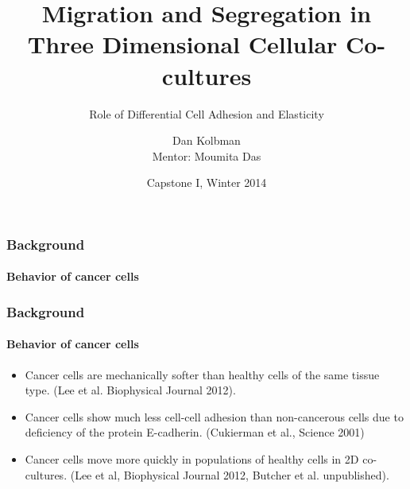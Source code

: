 \documentclass{beamer}
\begin{document}
  \title[Crisis] %
  {Migration and Segregation in Three Dimensional Cellular Co-cultures}
  \subtitle{Role of Differential Cell Adhesion and Elasticity}
  \author[Author, Kolbman] %
  {Dan Kolbman\\Mentor: Moumita Das}
  \date[2014]
  {Capstone I, Winter 2014}
  \subject{info}

  \frame{\titlepage}


  \begin{frame}
    \frametitle{Background}
    \framesubtitle{Behavior of cancer cells}


    \vfill
    
  \end{frame}  
  
  \begin{frame}
    \frametitle{Background}
    \framesubtitle{Behavior of cancer cells}
    
    \begin{itemize}
    \item Cancer cells are mechanically softer than healthy cells of the same tissue type. 
    (Lee et al. Biophysical Journal 2012).
    \item Cancer cells show much less cell-cell adhesion than non-cancerous cells  due to deficiency of the protein E-cadherin. 
    (Cukierman et al., Science 2001)
    \item Cancer cells move more quickly in populations of healthy cells in 2D co-cultures. 
    (Lee et al, Biophysical Journal 2012, Butcher et al. unpublished).
    \end{itemize}
    \vfill
    
  \end{frame}  
  
\end{document}
